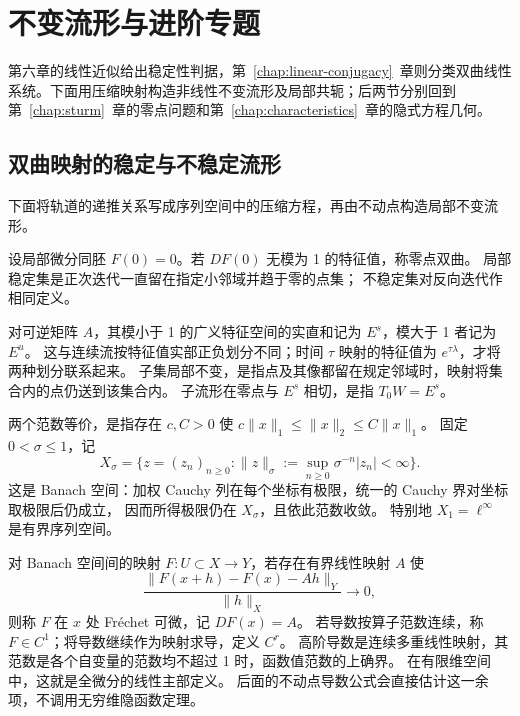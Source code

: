 \chapter{不变流形与进阶专题}\label{chap:invariant-manifolds}

第六章的线性近似给出稳定性判据，第~\ref{chap:linear-conjugacy}~章则分类双曲线性系统。下面用压缩映射构造非线性不变流形及局部共轭；后两节分别回到第~\ref{chap:sturm}~章的零点问题和第~\ref{chap:characteristics}~章的隐式方程几何。

\section{双曲映射的稳定与不稳定流形}
下面将轨道的递推关系写成序列空间中的压缩方程，再由不动点构造局部不变流形。
\begin{definition}
设局部微分同胚 $F(0)=0$。若 $DF(0)$ 无模为 1 的特征值，称零点双曲。
局部稳定集是正次迭代一直留在指定小邻域并趋于零的点集；
不稳定集对反向迭代作相同定义。
\end{definition}

\begin{definition}[映射的稳定子空间与局部不变性]
对可逆矩阵 $A$，其模小于 1 的广义特征空间的实直和记为 $E^s$，模大于 1 者记为 $E^u$。
这与连续流按特征值实部正负划分不同；时间 $\tau$ 映射的特征值为 $e^{\tau\lambda}$，才将两种划分联系起来。
子集局部不变，是指点及其像都留在规定邻域时，映射将集合内的点仍送到该集合内。
子流形在零点与 $E^s$ 相切，是指 $T_0W=E^s$。
\end{definition}
\begin{definition}[等价范数与加权序列空间]\label{def:weighted-banach}
两个范数等价，是指存在 $c,C>0$ 使 $c\|x\|_1\leq\|x\|_2\leq C\|x\|_1$。
固定 $0<\sigma\leq1$，记
\[
 X_\sigma=\{z=(z_n)_{n\geq0}:\|z\|_\sigma:=\sup_{n\geq0}\sigma^{-n}|z_n|<\infty\}.
\]
这是 Banach 空间：加权 Cauchy 列在每个坐标有极限，统一的 Cauchy 界对坐标取极限后仍成立，
因而所得极限仍在 $X_\sigma$，且依此范数收敛。
特别地 $X_1=\ell^\infty$ 是有界序列空间。
\end{definition}
\begin{definition}\label{def:frechet-derivative}
对 Banach 空间间的映射 $F:U\subset X\to Y$，若存在有界线性映射 $A$ 使
\[
 \frac{\|F(x+h)-F(x)-Ah\|_Y}{\|h\|_X}\longrightarrow0,
\]
则称 $F$ 在 $x$ 处 Fréchet 可微，记 $DF(x)=A$。
若导数按算子范数连续，称 $F\in C^1$；将导数继续作为映射求导，定义 $C^r$。
高阶导数是连续多重线性映射，其范数是各个自变量的范数均不超过 1 时，函数值范数的上确界。
在有限维空间中，这就是全微分的线性主部定义。
后面的不动点导数公式会直接估计这一余项，不调用无穷维隐函数定理。
\end{definition}

